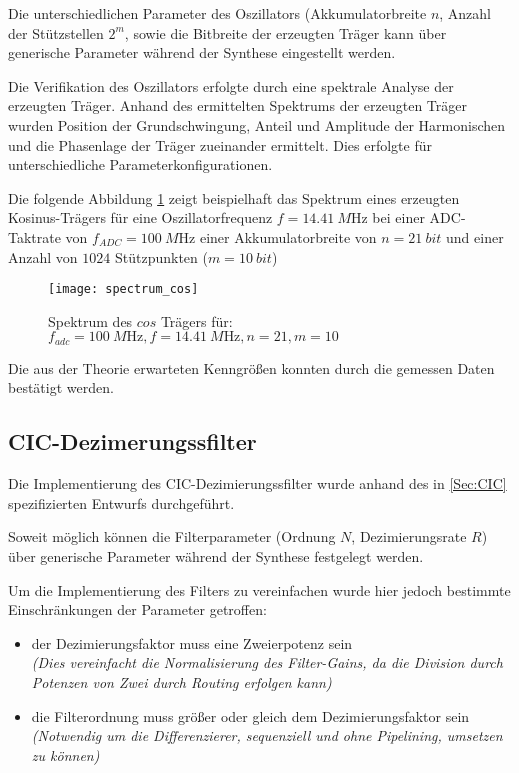 Die unterschiedlichen Parameter des Oszillators (Akkumulatorbreite $n$, Anzahl der Stützstellen $2^m$, sowie die Bitbreite der erzeugten Träger kann über generische
Parameter während der Synthese eingestellt werden.

Die Verifikation des Oszillators erfolgte durch eine spektrale Analyse der erzeugten Träger.
Anhand des ermittelten Spektrums der erzeugten Träger wurden Position der Grundschwingung, Anteil und Amplitude der Harmonischen und die Phasenlage der Träger zueinander ermittelt.
Dies erfolgte für unterschiedliche Parameterkonfigurationen.

Die folgende Abbildung \ref{Abb:Carrier} zeigt beispielhaft das Spektrum eines erzeugten Kosinus-Trägers für eine Oszillatorfrequenz $f=\qty{14.41}{M\hertz}$ bei einer \acs{ADC}-Taktrate von $f_{ADC}=\qty{100}{M\hertz}$ einer 
Akkumulatorbreite von $n=\qty{21}{bit}$ und einer Anzahl von $1024$ Stützpunkten ($m=\qty{10}{bit}$)

\begin{figure}[h]
	\centering
	\texttt{[image: spectrum\_cos]}
	\caption{Spektrum des $cos$ Trägers für: $f_{adc}=\qty{100}{M\hertz},f=\qty{14.41}{M\hertz}, n=21, m=10$ }
	 \label{Abb:Carrier}
\end{figure}

Die aus der Theorie erwarteten Kenngrößen\cite{IEEE_ART_DDS} konnten durch die gemessen Daten bestätigt werden.

\subsection{\acs{CIC}-Dezimerungssfilter}
Die Implementierung des \acs{CIC}-Dezimierungssfilter wurde anhand des in \ref{Sec:CIC} spezifizierten Entwurfs durchgeführt.

Soweit möglich können die Filterparameter (Ordnung $N$, Dezimierungsrate $R$) über generische Parameter während der Synthese festgelegt werden.

Um die Implementierung des Filters zu vereinfachen wurde hier jedoch bestimmte Einschränkungen der Parameter getroffen:
\begin{itemize}
	\item der Dezimierungsfaktor muss eine Zweierpotenz sein\\
	      \textit{(Dies vereinfacht die Normalisierung des Filter-Gains, da die Division durch Potenzen von Zwei durch Routing erfolgen kann)}
	\item die Filterordnung muss größer oder gleich dem Dezimierungsfaktor sein\\
		  \textit{(Notwendig um die Differenzierer, sequenziell und ohne Pipelining, umsetzen zu können)} 
\end{itemize}

